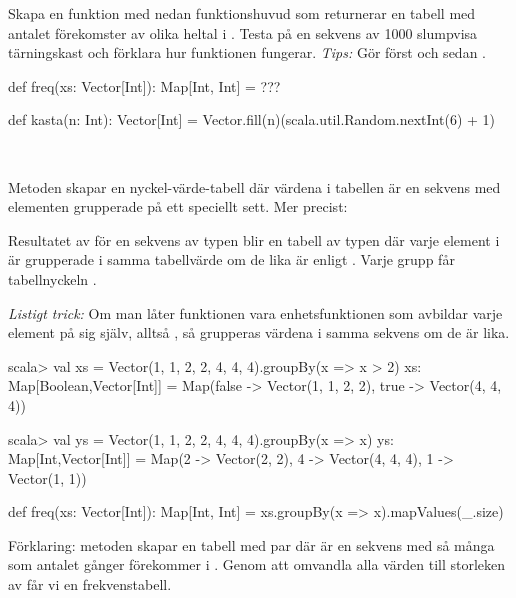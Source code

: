 \Subtask Skapa en funktion  med nedan funktionshuvud som returnerar en tabell med antalet förekomster av olika heltal i . Testa  på en sekvens av 1000 slumpvisa tärningskast och förklara hur funktionen  fungerar. \emph{Tips:} Gör först  och sedan .

\begin{Code}
def freq(xs: Vector[Int]): Map[Int, Int] = ???

def kasta(n: Int): Vector[Int] =
  Vector.fill(n)(scala.util.Random.nextInt(6) + 1)
\end{Code}

\SOLUTION

\TaskSolved \what~

\SubtaskSolved Metoden  skapar en nyckel-värde-tabell där värdena i tabellen är en sekvens med elementen grupperade på ett speciellt sett.
Mer precist:

Resultatet av  för en sekvens  av typen  blir en tabell av typen  där varje element  i  är grupperade i samma tabellvärde om de lika är enligt . Varje grupp får tabellnyckeln .

\emph{Listigt trick:} Om man låter funktionen  vara enhetsfunktionen som avbildar varje element på sig själv, alltså , så grupperas värdena i samma sekvens om de är lika.

\begin{REPL}
scala> val xs = Vector(1, 1, 2, 2, 4, 4, 4).groupBy(x => x > 2)
xs: Map[Boolean,Vector[Int]] =
  Map(false -> Vector(1, 1, 2, 2), true -> Vector(4, 4, 4))

scala> val ys = Vector(1, 1, 2, 2, 4, 4, 4).groupBy(x => x)
ys: Map[Int,Vector[Int]] =
  Map(2 -> Vector(2, 2), 4 -> Vector(4, 4, 4), 1 -> Vector(1, 1))
\end{REPL}


\SubtaskSolved

\begin{Code}
def freq(xs: Vector[Int]): Map[Int, Int] = xs.groupBy(x => x).mapValues(_.size)
\end{Code}
Förklaring: metoden  skapar en tabell med par  där  är en sekvens med så många  som antalet gånger  förekommer i . Genom att omvandla alla värden  till storleken av  får vi en frekvenstabell.


